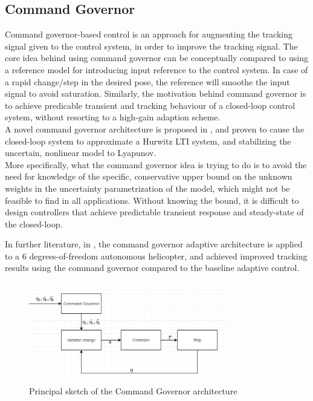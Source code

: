 \newpage
\subsection{Command Governor}


Command governor-based control is an approach for augmenting the tracking signal given to the control system, in order to improve the tracking signal. The core idea behind using command governor can be conceptually compared to using a reference model for introducing input reference to the control system. In case of a rapid change/step in the desired pose, the reference will smoothe the input signal to avoid saturation. Similarly, the motivation behind command governor is to achieve predicable transient and tracking behaviour of a closed-loop control system, without resorting to a high-gain adaption scheme. \\A novel command governor architecture is proposed in \cite{CommandGov}, and proven to cause the closed-loop system to approximate a Hurwitz LTI system, and stabilizing the uncertain, nonlinear model to Lyapunov. \\ More specifically, what the command governor idea is trying to do is to avoid the need for knowledge of the specific, conservative upper bound on the unknown weights in the uncertainty parametrization of the model, which might not be feasible to find in all applications. Without knowing the bound, it is difficult to design controllers that achieve predictable transient response and steady-state of the closed-loop.

In further literature, in \cite{CommandGov2}, the command governor adaptive architecture is applied to a 6 degrees-of-freedom autonomous helicopter, and achieved improved tracking results using the command governor compared to the baseline adaptive control. 

\begin{figure}[!h]
    \centering
    \includegraphics[width=0.78\textwidth]{fig/CGconcept.png}
    \caption{Principal sketch of the Command Governor architecture}
    \label{fig:CGsketch}
\end{figure}

